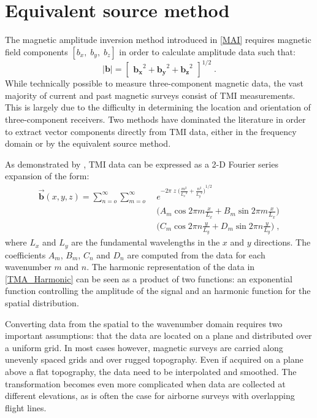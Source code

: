 \newpage
\section{Equivalent source method}\label{EQS}

The magnetic amplitude inversion method introduced in  \ref{MAI} requires magnetic field components $[b_x,\; b_y,\; b_z]$ in order to calculate amplitude data such that:
\begin{equation}\label{AmpMagData}
\mathbf{|b|} = 
	\begin{bmatrix}
		\mathbf{b_x}^2 + \mathbf{b_y}^2 + \mathbf{b_z}^2
	\end{bmatrix} ^{1/2}  \;.
\end{equation}
While technically possible to measure three-component magnetic data, the vast majority of current and past magnetic surveys consist of TMI measurements.  
This is largely due to the difficulty in determining the location and orientation of three-component receivers. 
Two methods have dominated the literature in order to extract vector components directly from TMI data, either in the frequency domain or by the equivalent source method. 

As demonstrated by \cite{Bhattacharyya64}, TMI data can be expressed as a 2-D Fourier series expansion of the form:
\begin{equation}\label{TMA_Harmonic}
\begin{split}
\mathbf{\vec b}(x,y,z) = \sum_{n=o}^\infty  \sum_{m=o}^\infty \; & e^{{ -2 \pi \; z \; \Big( \frac{m^2}{{L_x}^2} + \frac{n^2}{{L_y}^2} \Big) }^{1/2}} \\
& \Big(A_m \cos{2\pi m \frac{x}{L_x}} + B_m \sin{2\pi m \frac{x}{L_x}}\Big) \\
& \Big(C_m \cos{2\pi n \frac{y}{L_y}} + D_m \sin{2\pi n \frac{y}{L_y}}\Big)\;,
\end{split}
\end{equation}
where $ L_x$ and $L_y$ are the fundamental wavelengths in the $x$ and $y$ directions. The coefficients $A_m$, $B_m$, $C_n$ and $D_n$ are computed from the data for each wavenumber $m$ and $n$. The harmonic representation of the data in \eqref{TMA_Harmonic} can be seen as a product of two functions: an exponential function controlling the amplitude of the signal and an harmonic function for the spatial distribution. 

Converting data from the spatial to the wavenumber domain requires two important assumptions: that the data are located on a plane and distributed over a uniform grid. In most cases however, magnetic surveys are carried along unevenly spaced grids and over rugged topography. Even if acquired on a plane above a  flat topography, the data need to be interpolated and smoothed.
The transformation becomes even more complicated when data are collected at different elevations, as is often the case for airborne surveys with overlapping flight lines.
 
